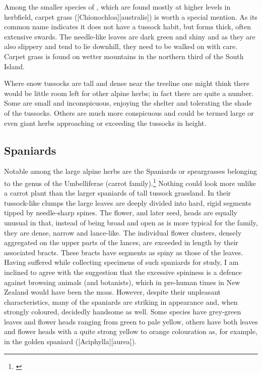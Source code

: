 Among the smaller species of , which are found mostly at higher levels in herbfield, carpet grass ([Chionochloa][australis]) is worth a special mention.
As its common name indicates it does not have a tussock habit, but forms thick, often extensive swards.
The needle-like leaves are dark green and shiny and as they are also slippery and tend to lie downhill, they need to be walked on with care.
Carpet grass is found on wetter mountains in the northern third of the South Island.

Where snow tussocks are tall and dense near the treeline one might think there would be little room left for other alpine herbs; in fact there are quite a number.
Some are small and inconspicuous, enjoying the shelter and tolerating the shade of the tussocks.
Others are much more conspicuous and could be termed large or even giant herbs approaching or exceeding the tussocks in height.

\subsection{Spaniards}

Notable among the large alpine herbs are the Spaniards or speargrasses belonging to the genus  of the Umbelliferae (carrot family).\footnote{\cite{dawson1978research}}
Nothing could look more unlike a carrot plant than the larger spaniards of tall tussock grassland.
In their tussock-like clumps the large leaves are deeply divided into hard, rigid segments tipped by needle-sharp spines.
The flower, and later seed, heads are equally unusual in that, instead of being broad and open as is more typical for the family, they are dense, narrow and lance-like.
The individual flower clusters, densely aggregated on the upper parts of the lances, are exceeded in length by their associated bracts.
These bracts have segments as spiny as those of the leaves.
Having suffered while collecting specimens of such spaniards for study, I am inclined to agree with the suggestion that the excessive spininess is a defence against browsing animals (and botanists), which in pre-human times in New Zealand would have been the moas.
However, despite their unpleasant characteristics, many of the spaniards are striking in appearance and, when strongly coloured, decidedly handsome as well.
Some species have grey-green leaves and flower heads ranging from green to pale yellow, others have both leaves and flower heads with a quite strong yellow to orange colouration as, for example, in the golden spaniard ([Aciphylla][aurea]).

